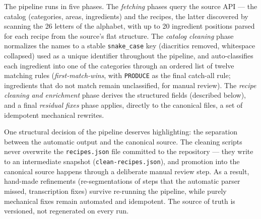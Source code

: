The pipeline runs in five phases. The \textit{fetching} phases query the source API --- the catalog (categories, areas, ingredients) and the recipes, the latter discovered by scanning the 26 letters of the alphabet, with up to 20 ingredient positions parsed for each recipe from the source's flat structure. The \textit{catalog cleaning} phase normalizes the names to a stable \texttt{snake\_case} key (diacritics removed, whitespace collapsed) used as a unique identifier throughout the pipeline, and auto-classifies each ingredient into one of the categories through an ordered list of twelve matching rules (\textit{first-match-wins}, with \texttt{PRODUCE} as the final catch-all rule; ingredients that do not match remain unclassified, for manual review). The \textit{recipe cleaning and enrichment} phase derives the structured fields (described below), and a final \textit{residual fixes} phase applies, directly to the canonical files, a set of idempotent mechanical rewrites.

One structural decision of the pipeline deserves highlighting: the separation between the automatic output and the canonical source. The cleaning scripts never overwrite the \texttt{recipes.json} file committed to the repository --- they write to an intermediate snapshot (\texttt{clean-recipes.json}), and promotion into the canonical source happens through a deliberate manual review step. As a result, hand-made refinements (re-segmentations of steps that the automatic parser missed, transcription fixes) survive re-running the pipeline, while purely mechanical fixes remain automated and idempotent. The source of truth is versioned, not regenerated on every run.

